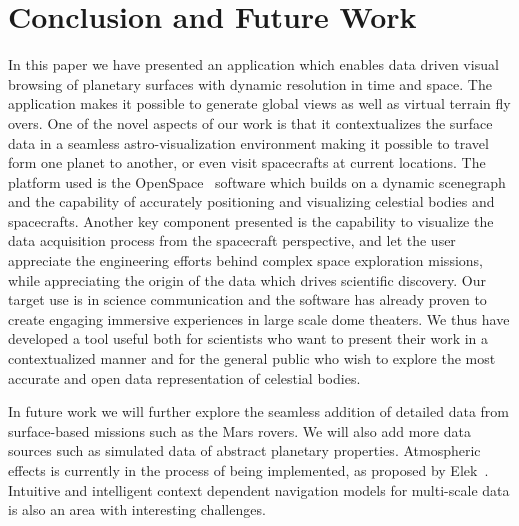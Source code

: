 \documentclass[journal]{vgtc}                %
\begin{document}

\section{Conclusion and Future Work} \label{sec:conclusion}
In this paper we have presented an application which enables data driven visual browsing of planetary surfaces with dynamic resolution in time and space. The application makes it possible to generate global views as well as virtual terrain fly overs. One of the novel aspects of our work is that it contextualizes the surface data in a seamless astro-visualization environment making it possible to travel form one planet to another, or even visit spacecrafts at current locations. The platform used is the OpenSpace~\cite{Bock_2015} software which builds on a dynamic scenegraph and the capability of accurately positioning and visualizing celestial bodies and spacecrafts. Another key component presented is the capability to visualize the data acquisition process from the spacecraft perspective, and let the user appreciate the engineering efforts behind complex space exploration missions, while appreciating the origin of the data which drives scientific discovery. Our target use is in science communication and the software has already proven to create engaging immersive experiences in large scale dome theaters. We thus have developed a tool useful both for scientists who want to present their work in a contextualized manner and for the general public who wish to explore the most accurate and open data representation of celestial bodies.

In future work we will further explore the seamless addition of detailed data from surface-based missions such as the Mars rovers. We will also add more data sources such as simulated data of abstract planetary properties. Atmospheric effects is currently in the process of being implemented, as proposed by Elek~\cite{elek2009rendering}. Intuitive and intelligent context dependent navigation models for multi-scale data is also an area with interesting challenges. 



%

%
%
%


\end{document}
